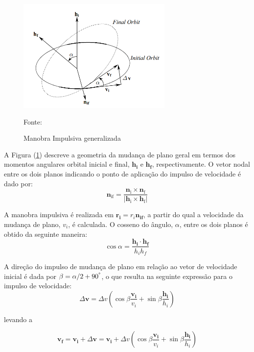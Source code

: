 \begin{figure}[h]
        \centering
        \includegraphics[width=3in]{figuras/monoimspul.png}
        \caption{Manobra Impulsiva generalizada}
        \footnotesize Fonte: \cite{livro:andre}
        \label{fig:monoluiz}
\end{figure} 


A Figura (\ref{fig:monoluiz}) descreve a geometria da mudança de plano geral em termos dos momentos angulares orbital inicial e final, $\mathbf{h_i}$ e $\mathbf{h_f}$, respectivamente. O vetor nodal entre os dois planos indicando o ponto de aplicação do impulso de velocidade é dado por:
\begin{equation}
\mathbf{n}_{\text{if}}=\frac{\mathbf{n}_{\text{i}}\times\mathbf{n}_{\text{f}}}{|\mathbf{h}_{\text{i}}\times\mathbf{h}_{\text{f}}|}
\label{eq:5.39}
\end{equation}

A manobra impulsiva é realizada em $\mathbf{r_i }= r_{i}{\mathbf{n_{if}}}$, a partir do qual a velocidade da mudança de plano, $v_i$, é calculada. O cosseno do ângulo, $\alpha$, entre os dois planos é obtido da seguinte maneira:
\begin{equation}
\cos\alpha=\frac{\textbf{h}_\textbf{i}\cdot\textbf{h}_\textbf{f}}{h_ih_f}
\label{eq:5.40}
\end{equation}

A direção do impulso de mudança de plano em relação ao vetor de velocidade inicial é dada por $\beta = \alpha/2 + 90^\degree$, o que resulta na seguinte expressão para o impulso de velocidade:
\begin{equation}
\Delta\mathbf{v}=\Delta v(\cos\beta\frac{\mathbf{v_i}}{v_i}+\sin\beta\frac{\mathbf{h_i}}{h_i})
\label{eq:5.41}
\end{equation}

levando a

\begin{equation}
\mathbf{v_f}=\mathbf{v_i}+\Delta\mathbf{v}=\mathbf{v_i}+\Delta v(\cos\beta\frac{\mathbf{v_i}}{v_i}+\sin\beta\frac{\mathbf{h_i}}{h_i})
\label{eq:5.42}
\end{equation}

